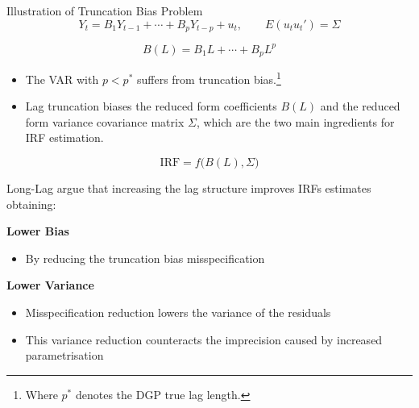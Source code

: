 \documentclass[11pt]{beamer}
\begin{document}

\begin{frame}{Illustration of Truncation Bias Problem}
    \begin{equation}
        Y_t = B_1Y_{t-1} + \cdots + B_pY_{t-p} + u_t, \qquad E(u_t u_t') = \Sigma
    \end{equation}

    \begin{equation}
        B(L) = B_1L + \cdots + B_pL^p
    \end{equation}

    \begin{itemize}
        \item The VAR with $p < p^{*}$ suffers from truncation bias.\footnote{Where $p^{*}$ denotes the DGP true lag length.}

        \item Lag truncation biases the reduced form coefficients $B(L)$ and the reduced form variance covariance matrix $\Sigma$, which are the two main ingredients for IRF estimation.
    \end{itemize}

    \begin{equation}
        \mathrm{IRF} = f\bigl(B(L),\Sigma\bigr)
    \end{equation}
\end{frame}


\begin{frame}{Long-Lag}
    \citet{Long_Lag2025} argue that increasing the lag structure improves IRFs estimates obtaining:
    \pause
    \vspace{0.4cm}
    
    \textbf{Lower Bias}
    \begin{itemize}
        \item By reducing the truncation bias misspecification
    \end{itemize}
    \pause

    \vspace{0.4cm}
    \textbf{Lower Variance}
    \begin{itemize}
        \item Misspecification reduction lowers the variance of the residuals
        \item This variance reduction counteracts the imprecision caused by increased parametrisation
    \end{itemize}
\end{frame}
\end{document}
